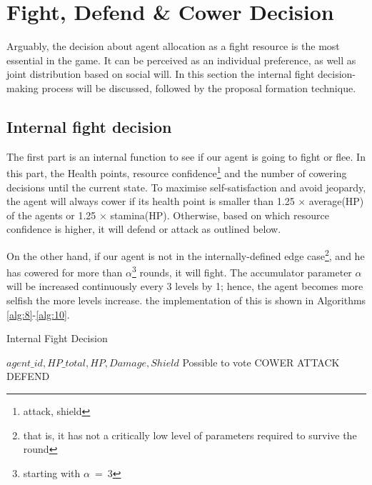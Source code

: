 \clearpage


\section{Fight, Defend \& Cower Decision}


Arguably, the decision about agent allocation as a fight resource is the most essential in the game. It can be perceived as an individual preference, as well as joint distribution based on social will. In this section the internal fight decision-making process will be discussed, followed by the proposal formation technique.


    \subsection{Internal fight decision}

        The first part is an internal function to see if our agent is going to fight or flee. In this part, the Health points, resource confidence\footnote{attack, shield} and the number of cowering decisions until the current state.
        To maximise self-satisfaction and avoid jeopardy, the agent will always cower if its health point is smaller  than  1.25 $\times$ average(HP) of the agents or 1.25 $\times$ stamina(HP). Otherwise, based on which resource confidence is higher, it will defend or attack as outlined below.

        On the other hand, if our agent is not in the internally-defined edge case\footnote{that is, it has not a critically low level of parameters required to survive the round}, and he has cowered for more than $\alpha$\footnote{starting with $\alpha~=~3$} rounds, it will fight. The accumulator parameter $\alpha$ will be increased continuously every 3 levels by 1; hence, the agent becomes more selfish the more levels increase. the implementation of this is shown in Algorithms \ref{alg:8}-\ref{alg:10}. 


\begin{algorithm}[htb]
\caption{Internal Fight Decision}\label{alg:8}
\begin{algorithmic} 
\scriptsize
\Require $agent\_id, HP\_total, HP, Damage, Shield$
\Ensure Possible to vote
\Return COWER
\EndIf
\Return ATTACK
\EndIf
{}
\Return DEFEND
\EndIf
\end{algorithmic}
\end{algorithm}

